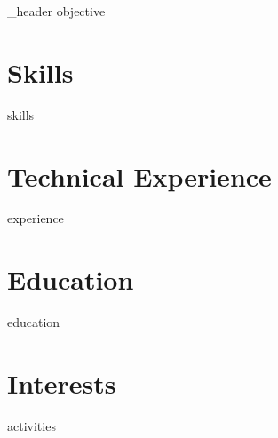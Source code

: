 \documentclass[letter,10pt]{article}
\author{Marvin Taschenberger }
\begin{document}
    {_header}
    {objective}

    \section{Skills}
    {skills}

    \section{Technical Experience}
    {experience}

    \section{Education}
    {education}

    \section{Interests}
    {activities}
\end{document}
